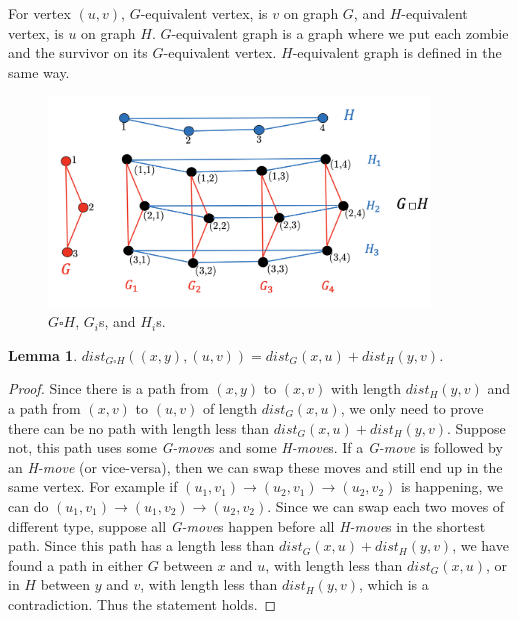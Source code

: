 \documentclass[1p]{elsarticle}
\newtheorem{lemma}[theorem]{Lemma}
\begin{document}
For vertex $(u,v)$, $G$-equivalent vertex, is $v$ on graph $G$, and $H$-equivalent vertex, is $u$ on graph $H$.
$G$-equivalent graph is a graph where we put each zombie and the survivor on its $G$-equivalent vertex. $H$-equivalent
graph is defined in the same way.


\begin{figure}[h!]
	
	\centering
	\includegraphics[width=0.9\textwidth]{fig/cp3.png}
	\caption{$G \square H$, $G_i$s, and $H_i$s.}
	\label{fig:p1}
\end{figure}



\begin{lemma} \label{shortestpathlemma}
	$dist_{G \square H}((x,y),(u,v)) = dist_G(x,u) + dist_H(y,v)$.
\end{lemma}
\begin{proof}
	Since there is a path from $(x,y)$ to $(x,v)$ with length $dist_H(y,v)$ and a path from $(x,v)$ to $(u,v)$ of length
	$dist_G(x,u)$, we only need to prove there can be no path with length less than $dist_G(x,u) + dist_H(y,v)$.
	Suppose not, this path uses some {\it G-move}s and some {\it H-move}s. If a {\it G-move} is followed by an {\it
	H-move} (or vice-versa), then we can swap these moves and still end up in the same vertex. For example if $(u_1,v_1)
	\rightarrow (u_2,v_1) \rightarrow (u_2,v_2)$ is happening, we can do $(u_1,v_1) \rightarrow (u_1,v_2) \rightarrow
	(u_2,v_2)$. Since we can swap each two moves of different type, suppose all {\it G-move}s happen before all {\it
	H-move}s in the shortest path. Since this path has a length less than $dist_G(x,u) + dist_H(y,v)$, we have found a
	path in either $G$ between $x$ and $u$, with length less than $dist_G(x,u)$, or in $H$ between $y$ and $v$, with
	length less than $dist_H(y,v)$, which is a contradiction. Thus the statement holds.
\end{proof}
\end{document}
